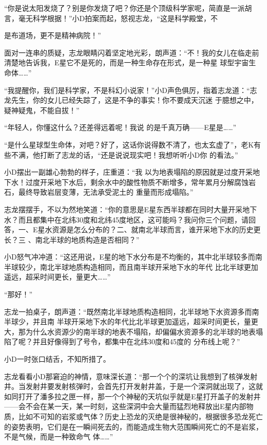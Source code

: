 \documentclass{article}
\begin{document}
“你是说太阳发烧了？别是你发烧了吧？你还是个顶级科学家呢，简直是一派胡言，毫无科学根据！”小D拍案而起，怒视志龙，“这是科学殿堂，不
\newpage

是布道场，更不是精神病院！” 

面对一连串的质疑，志龙眼睛闪着坚定地光彩，朗声道：“不！我的女儿在临走前清楚地告诉我，E星它不是死的，而是一种生命存在形式，是一种星
球型宇宙生命体……” 

“我提醒你，我们是科学家，不是科幻小说家！”小D声色俱厉，指着志龙道：“志龙先生，你的女儿已经失踪了，这是不争的事实！你不要成天沉迷
于臆想之中，疑神疑鬼，不能自拔！” 

“年轻人，你懂这什么？还差得远着呢！我说
的是千真万确——E星是……” 

“是什么星球型生命体，对吧？好了，这话你说得数不清了，也太玄虚了”，老K有些不满，他打断了志龙的话，“还是说说现实吧！我想听听小D你
的看法。” 

小D摆出一副雄心勃勃的样子，庄重道：“我
\newpage
以为地表塌陷的原因就是过度开采地下水！过度开采地下水后，剩余水中的酸性物质不断增多，常年累月分解腐蚀岩石，最终导致岩层变薄，无法承受泥土的
重量而形成塌陷。” 

志龙摆摆手，不以为然地笑道：“你的意思是E星东西半球都在同时大量开采地下水？而且都集中在北纬30度和北纬45度地区，这可能吗？我问你三个问题，请回答，一、E星水资源是怎么分布的？二、就南北半球而言，谁开采地下水的历史更长？三
、南北半球的地质构造是否相同？” 

小D怒气冲冲道：“这还用说，E星的地下水分布是不均衡的，其中北半球较多而南半球较少，南北半球地质构造相同，而且南半球开采地下水的年代
比北半球更加遥远，超采时间更长，量更大……” 


“那好！” 

志龙一拍桌子，朗声道：“既然南北半球地质构造相同，北半球地下水资源多而南半球少，并且南
\newpage
半球开采地下水的年代比北半球更加遥远，超采时间更长，量更大，那为什么水资源少的南半球的地表不塌陷，却偏偏水资源多的北半球的地表塌陷了呢？并且好像得到了号令，都集中在北纬30度和45度的
分布线上呢？” 


小D一时张口结舌，不知所措了。 

志龙看看小D那窘迫的神情，意味深长道：“那一个个的深坑让我想到了核弹发射井。当发射井要发射核弹时，会首先打开发射井盖，于是一个深洞就出现了，这就如同打开了潘多拉之匣一样，那一个个神秘的天坑似乎就是E星打开盖子的发射井——会不会在某一天，某一时刻，这些深洞中会大量而猛烈地释放出E星内部物质，比如不可知的岩浆或气体？历史上恐龙的灭绝是很神秘的，根据很多恐龙死亡的姿势表明，它们是在一瞬间死去的，而能造成生物大范围瞬间死亡的不是岩浆，不是气候，而是一种致命气
体……” 
\end{document}
